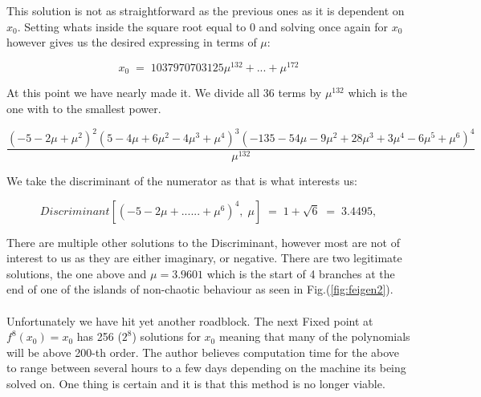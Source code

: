 This solution is not as straightforward as the previous ones as it is dependent on $x_0$.
Setting whats inside the square root equal to 0 and solving once again for $x_0$ however gives us
the desired expressing in terms of $\mu$:

\begin{equation}
x_0\;=\;1037970703125 \mu^132 + ... + \mu^172
\end{equation}

At this point we have nearly made it. We divide all 36 terms by $\mu^{132}$ which is the one with to the smallest power.

\begin{equation}
\frac{(-5 - 2 \mu + \mu^2)^2 (5 - 4 \mu + 6 \mu^2 - 4 \mu^3 + \mu^4)^3 (-135 - 54 \mu - 
   9 \mu^2 + 28 \mu^3 + 3 \mu^4 - 6 \mu^5 + \mu^6)^4}{\mu^{132}}
\end{equation}

We take the discriminant of the numerator as that is what interests us:

\begin{equation}
Discriminant[(-5 - 2 \mu +......+ \mu^6)^4,\;\mu]\;=\;1+\sqrt{6}\;=\;3.4495, 
\end{equation}

There are multiple other solutions to the Discriminant, however most are not of interest to us
as they are either imaginary, or negative. There are two legitimate solutions, the one above and
$\mu = 3.9601$ which is the start of 4 branches at the end of one of the islands of non-chaotic behaviour
as seen in Fig.(\ref{fig:feigen2}).

\paragraph{}

Unfortunately we have hit yet another roadblock. The next Fixed point at $f^8(x_0) = x_0$ has
256 ($2^8$) solutions for $x_0$ meaning that many of the polynomials will be above 200-th order.
The author believes computation time for the above to range between several hours to a few days depending on 
the machine its being solved on. One thing is certain and it is that this method is no longer viable.

